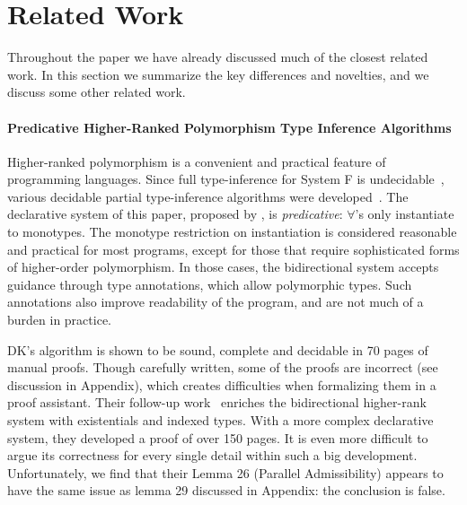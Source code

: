 \section{Related Work}

Throughout the paper we have already discussed much of the closest related work.
In this section we summarize the key differences and novelties, and we discuss some other
related work.


\paragraph{Predicative Higher-Ranked Polymorphism Type Inference Algorithms}
Higher-ranked polymorphism is a convenient and practical feature of
programming languages.  Since full type-inference for System F is
undecidable~\cite{wells1999typability}, various decidable partial
type-inference algorithms were developed~\cite{}.  The declarative system of
this paper, proposed by \citet{dunfield2013complete}, is \emph{predicative}: 
$\forall$'s only instantiate to monotypes.  The monotype restriction
on instantiation is considered reasonable and practical for most
programs, except for those that require sophisticated forms of
higher-order polymorphism.  In those cases, the bidirectional system
accepts guidance through type annotations, which allow polymorphic types.
Such annotations also improve
readability of the program, and are not much of a burden in practice.

DK's algorithm is shown to be sound, complete and decidable in 70 pages of manual proofs.
Though carefully written, some of the proofs are incorrect (see discussion in Appendix),
which creates difficulties when formalizing them in a proof assistant.
Their follow-up work~\cite{} enriches the bidirectional higher-rank system with
existentials and indexed types.
With a more complex declarative system, they developed a proof of over 150 pages.
It is even more difficult to argue its correctness for every single detail within such a big development.
Unfortunately, we find that their Lemma 26 (Parallel Admissibility) appears to have the same issue 
as lemma 29 discussed in Appendix: the conclusion is false.

